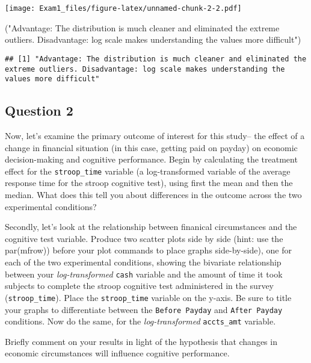 \documentclass[
]{article}
\newenvironment{Shaded}{\begin{snugshade}}{\end{snugshade}}
\newcommand{\NormalTok}[1]{#1}
\newcommand{\StringTok}[1]{\textcolor[rgb]{0.31,0.60,0.02}{#1}}
\begin{document}
\texttt{[image: Exam1\_files/figure-latex/unnamed-chunk-2-2.pdf]}

\begin{Shaded}
\begin{Highlighting}[]
\NormalTok{(}\StringTok{"Advantage: The distribution is much cleaner and eliminated the extreme outliers. Disadvantage: log scale makes understanding the values more difficult"}\NormalTok{)}
\end{Highlighting}
\end{Shaded}

\begin{verbatim}
## [1] "Advantage: The distribution is much cleaner and eliminated the extreme outliers. Disadvantage: log scale makes understanding the values more difficult"
\end{verbatim}

\hypertarget{question-2}{%
\subsection{Question 2}\label{question-2}}

Now, let's examine the primary outcome of interest for this study-- the
effect of a change in financial situation (in this case, getting paid on
payday) on economic decision-making and cognitive performance. Begin by
calculating the treatment effect for the \texttt{stroop\_time} variable
(a log-transformed variable of the average response time for the stroop
cognitive test), using first the mean and then the median. What does
this tell you about differences in the outcome across the two
experimental conditions?

Secondly, let's look at the relationship between finanical circumstances
and the cognitive test variable. Produce two scatter plots side by side
(hint: use the par(mfrow)) before your plot commands to place graphs
side-by-side), one for each of the two experimental conditions, showing
the bivariate relationship between your \emph{log-transformed}
\texttt{cash} variable and the amount of time it took subjects to
complete the stroop cognitive test administered in the survey
(\texttt{stroop\_time}). Place the \texttt{stroop\_time} variable on the
y-axis. Be sure to title your graphs to differentiate between the
\texttt{Before\ Payday} and \texttt{After\ Payday} conditions. Now do
the same, for the \emph{log-transformed} \texttt{accts\_amt} variable.

Briefly comment on your results in light of the hypothesis that changes
in economic circumstances will influence cognitive performance.
\end{document}
